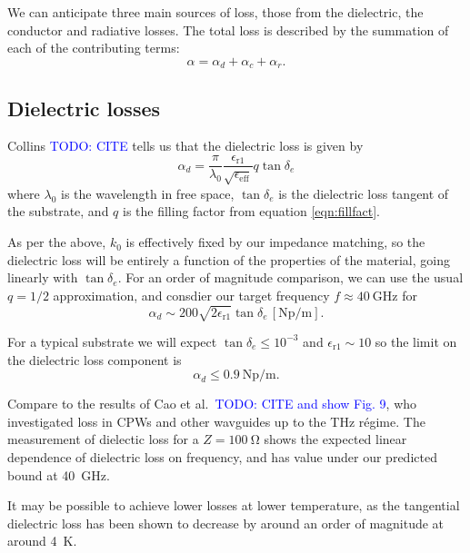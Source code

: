 \documentclass[a4paper]{article}
\newcommand{\cm}[1]{\textcolor{blue}{#1}} %
\begin{document}
We can anticipate three main sources of loss, those from the dielectric, the
conductor and radiative losses. \cite{Simons2004} The total loss is described
by the summation of each of the contributing terms:
\begin{equation}
  \alpha = \alpha_d + \alpha_c + \alpha_r.
\end{equation}

\subsection{Dielectric losses}

Collins \cm{TODO: CITE} tells us that the dielectric loss is given by
\begin{equation}
  \alpha_d =
  \frac{\pi}{\lambda_0}\frac{\epsilon_\mathrm{r1}}{\sqrt{\epsilon_\mathrm{eff}}}
  q \tan \delta_e
\end{equation}
where $\lambda_0$ is the wavelength in free space, $\tan \delta_e$ is the
dielectric loss tangent of the substrate, and $q$ is the filling factor from
equation \ref{eqn:fillfact}.

As per the above, $k_0$ is effectively fixed by our impedance matching, so the
dielectric loss will be entirely a function of the properties of the material,
going linearly with $\tan\delta_e$. For an order of magnitude comparison, we can
use the usual $q=1/2$ approximation, and consdier our target frequency
$f\approx\SI{40}{\giga\hertz}$ for
\begin{equation}
  \alpha_d \sim 200\sqrt{2\epsilon_\mathrm{r1}}\tan\delta_e
  \,[\si{\neper\per\meter}].
\end{equation}

For a typical substrate we will expect $\tan\delta_e\leq10^{-3}$ and
$\epsilon_\mathrm{r1} \sim 10$ so the limit on the dielectric loss component is
\begin{equation}
  \alpha_d \leq \SI{0.9}{\neper\per\meter}.
\end{equation}

Compare to the results of  Cao et al.~\cm{TODO: CITE and show Fig. 9}, who
investigated loss in CPWs and other wavguides up to the \si{\tera\hertz}
r\'egime. The measurement of dielectic loss for a $Z=\SI{100}{\ohm}$ shows the
expected linear dependence of dielectric loss on frequency, and has value under
our predicted bound at \SI{40}{\giga\hertz}.

It may be possible to achieve lower losses at lower temperature, as the
tangential dielectric loss has been shown to decrease by around an order of
magnitude at around \SI{4}{\kelvin}. \cite{1717770}
\end{document}
